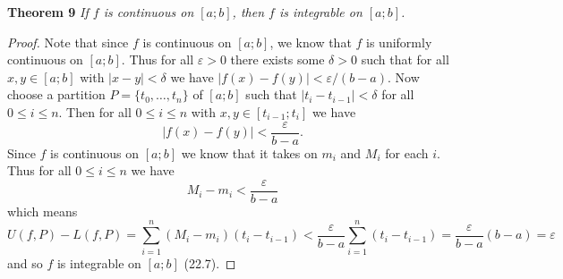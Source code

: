 \documentclass{article}
\begin{document}
\begin{flushleft}
\textbf{Theorem 9}
\textsl{If $f$ is continuous on $[a;b]$, then $f$ is integrable on $[a;b]$.}
\begin{proof}
Note that since $f$ is continuous on $[a;b]$, we know that $f$ is uniformly continuous on $[a;b]$. Thus for all $\varepsilon > 0$ there exists some $\delta > 0$ such that for all $x,y \in [a;b]$ with $|x-y| < \delta$ we have $|f(x) - f(y)| < \varepsilon/(b-a)$. Now choose a partition $P = \{t_0, \dots , t_n\}$ of $[a;b]$ such that $|t_i-t_{i-1}| < \delta$ for all $0 \leq i \leq n$. Then for all $0 \leq i \leq n$ with $x,y \in [t_{i-1};t_i]$ we have
\[
|f(x)-f(y)| < \frac{\varepsilon}{b-a}.
\]
Since $f$ is continuous on $[a;b]$ we know that it takes on $m_i$ and $M_i$ for each $i$. Thus for all $0 \leq i \leq n$ we have
\[
M_i - m_i < \frac{\varepsilon}{b-a}
\]
which means
\[
U(f,P) - L(f,P) = \sum_{i=1}^n (M_i-m_i) (t_i-t_{i-1}) < \frac{\varepsilon}{b-a} \sum_{i=1}^n (t_i-t_{i-1}) = \frac{\varepsilon}{b-a}(b-a) = \varepsilon
\]
and so $f$ is integrable on $[a;b]$ (22.7).
\end{proof}


\end{flushleft}
\end{document}
